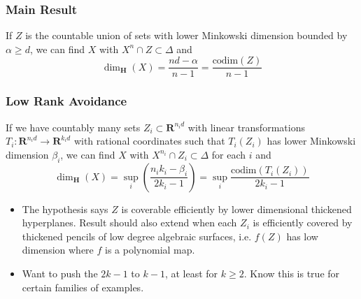\documentclass[handout,usenames,dvipsnames]{beamer}
\begin{document}
\begin{frame}
    \frametitle{Main Result}

    \begin{theorem}
        If $Z$ is the countable union of sets with lower Minkowski dimension bounded by $\alpha \geq d$, we can find $X$ with $X^n \cap Z \subset \Delta$ and
        \[ \dim_{\mathbf{H}}(X) = \frac{nd - \alpha}{n - 1} = \frac{\text{codim}(Z)}{n - 1} \]
    \end{theorem}

\end{frame}

\begin{frame}
    \frametitle{Low Rank Avoidance}

    \begin{theorem}
        If we have countably many sets $Z_i \subset \mathbf{R}^{n_id}$ with linear transformations $T_i: \mathbf{R}^{n_id} \to \mathbf{R}^{k_i d}$ with rational coordinates such that $T_i(Z_i)$ has lower Minkowski dimension $\beta_i$, we can find $X$ with $X^{n_i} \cap Z_i \subset \Delta$ for each $i$ and
        \[ \dim_{\mathbf{H}}(X) = \sup_i \left( \frac{n_ik_i - \beta_i}{2k_i - 1} \right) = \sup_i \frac{\text{codim}(T_i(Z_i))}{2k_i - 1} \]
    \end{theorem}

    \pause
    \begin{itemize}
        \item The hypothesis says $Z$ is coverable efficiently by lower dimensional thickened hyperplanes. Result should also extend when each $Z_i$ is efficiently covered by thickened pencils of low degree algebraic surfaces, i.e. $f(Z)$ has low dimension where $f$ is a polynomial map.

        \pause
        \item Want to push the $2k - 1$ to $k - 1$, at least for $k \geq 2$. Know this is true for certain families of examples.
    \end{itemize}
\end{frame}
\end{document}
